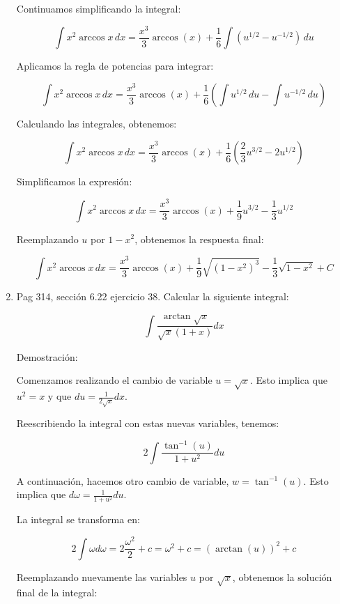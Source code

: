 \documentclass{report}
\begin{document}
\begin{enumerate}
        Continuamos simplificando la integral:
        
        \[ \int x^2 \arccos x \, dx = \frac{x^3}{3} \arccos(x) + \frac{1}{6} \int \left(u^{1/2} - u^{-1/2}\right) \, du \]
        
        Aplicamos la regla de potencias para integrar:
        
        \[ \int x^2 \arccos x \, dx = \frac{x^3}{3} \arccos(x) + \frac{1}{6} \left(\int u^{1/2} \, du - \int u^{-1/2} \, du \right) \]
        
        Calculando las integrales, obtenemos:
        
        \[ \int x^2 \arccos x \, dx = \frac{x^3}{3} \arccos(x) + \frac{1}{6} \left(\frac{2}{3} u^{3/2} - 2 u^{1/2}\right) \]
        
        Simplificamos la expresión:
        
        \[ \int x^2 \arccos x \, dx = \frac{x^3}{3} \arccos(x) + \frac{1}{9} u^{3/2} - \frac{1}{3} u^{1/2} \]
        
        Reemplazando $u$ por $1-x^2$, obtenemos la respuesta final:
        
        \[ \int x^2 \arccos x \, dx = \frac{x^3}{3} \arccos(x) + \frac{1}{9} \sqrt{(1-x^2)^3} - \frac{1}{3} \sqrt{1-x^2} + C \]
        
        \item Pag 314, sección 6.22 ejercicio 38. Calcular la siguiente integral:
        
        $$\int \frac{\arctan \sqrt{x}}{\sqrt{x}(1+x)} d x$$
        
        Demostración:
        
        Comenzamos realizando el cambio de variable $u=\sqrt{x}$. Esto implica que $u^{2}=x$ y que $du = \frac{1}{2 \sqrt{x}} dx$. 
        
        Reescribiendo la integral con estas nuevas variables, tenemos:
        
        $$2 \int \frac{\tan^{-1}(u)}{1+u^2} du$$
        
        A continuación, hacemos otro cambio de variable, $w = \tan^{-1}(u)$. Esto implica que $d\omega = \frac{1}{1+u^2} du$.
        
        La integral se transforma en:
        
        $$2 \int \omega d \omega = 2 \frac{\omega^2}{2} + c = \omega^2 + c = (\arctan(u))^2 + c$$
        
        Reemplazando nuevamente las variables $u$ por $\sqrt{x}$, obtenemos la solución final de la integral:
        

\end{enumerate}
\end{document}

